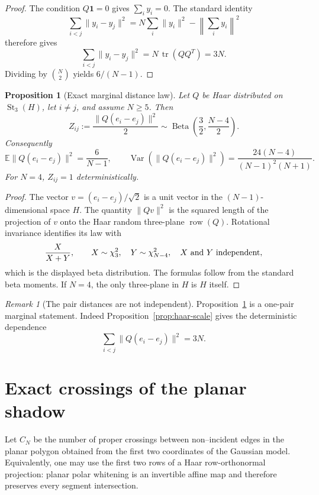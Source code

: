 \documentclass[11pt]{amsart}
\newtheorem{proposition}{Proposition}
\theoremstyle{remark}
\newtheorem{remark}{Remark}
\newcommand{\Ebb}{\mathbb{E}}
\newcommand{\1}{\mathbf{1}}
\newcommand{\row}{\operatorname{row}}
\newcommand{\St}{\operatorname{St}}
\begin{document}
\begin{proof}
The condition \(Q\1=0\) gives \(\sum_i y_i=0\).  The standard identity
\[
\sum_{i<j}\|y_i-y_j\|^2=N\sum_i\|y_i\|^2-\left\|\sum_i y_i\right\|^2
\]
therefore gives
\[
\sum_{i<j}\|y_i-y_j\|^2=N\,\operatorname{tr}(QQ^T)=3N.
\]
Dividing by \(\binom N2\) yields \(6/(N-1)\).
\end{proof}

\begin{proposition}[Exact marginal distance law]\label{prop:beta-distance}
Let \(Q\) be Haar distributed on \(\St_3(H)\), let \(i\ne j\), and assume
\(N\ge5\).  Then
\[
   Z_{ij}:=\frac{\|Q(e_i-e_j)\|^2}{2}
   \sim \operatorname{Beta}\left(\frac32,\frac{N-4}{2}\right).
\]
Consequently
\[
 \Ebb\|Q(e_i-e_j)\|^2=\frac6{N-1},\qquad
 \operatorname{Var}\!\left(\|Q(e_i-e_j)\|^2\right)
 =\frac{24(N-4)}{(N-1)^2(N+1)}.
\]
For \(N=4\), \(Z_{ij}=1\) deterministically.
\end{proposition}

\begin{proof}
The vector \(v=(e_i-e_j)/\sqrt2\) is a unit vector in the
\((N-1)\)-dimensional space \(H\).  The quantity \(\|Qv\|^2\) is the squared
length of the projection of \(v\) onto the Haar random three-plane
\(\row(Q)\).  Rotational invariance identifies its law with
\[
 \frac{X}{X+Y},\qquad X\sim\chi^2_3,\quad
 Y\sim\chi^2_{N-4},\quad X\ \hbox{and}\ Y\ \hbox{independent},
\]
which is the displayed beta distribution.  The formulas follow from the
standard beta moments.  If \(N=4\), the only three-plane in \(H\) is \(H\)
itself.
\end{proof}

\begin{remark}[The pair distances are not independent]
Proposition~\ref{prop:beta-distance} is a one-pair marginal statement.
Indeed Proposition~\ref{prop:haar-scale} gives the deterministic dependence
\[
   \sum_{i<j}\|Q(e_i-e_j)\|^2=3N.
\]
\end{remark}

\section{Exact crossings of the planar shadow}

Let \(C_N\) be the number of proper crossings between non--incident edges in
the planar polygon obtained from the first two coordinates of the
Gaussian model.  Equivalently, one may use the first two rows of a Haar
row-orthonormal projection: planar polar whitening is an invertible affine
map and therefore preserves every segment intersection.
\end{document}
